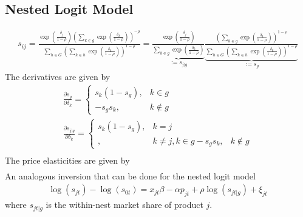\documentclass[11pt]{elegantbook}
\begin{document}
\subsection{Nested Logit Model}
\begin{equation}
    \begin{aligned}
        s_{ij}=\frac{\exp\left(\frac{\delta_{j}}{1-\rho}\right)\left(\sum_{k\in g}\exp\left(\frac{\delta_{k}}{1-\rho}\right)\right)^{-\rho}}{\sum_{h \in G}\left(\sum_{k\in h}\exp\left(\frac{\delta_{k}}{1-\rho}\right)\right)^{1-\rho}}=\underbrace{\frac{\exp\left(\frac{\delta_{j}}{1-\rho}\right)}{\sum_{k\in g}\exp\left(\frac{\delta_{k}}{1-\rho}\right)}}_{:=s_{j|g}}\underbrace{\frac{\left(\sum_{k\in g}\exp\left(\frac{\delta_{k}}{1-\rho}\right)\right)^{1-\rho}}{\sum_{h\in G}\left(\sum_{k\in h}\exp\left(\frac{\delta_{k}}{1-\rho}\right)\right)^{1-\rho}}}_{:=s_{g}}
    \end{aligned}
    \nonumber
\end{equation}
The derivatives are given by
\begin{equation}
    \begin{aligned}
        \frac{\partial s_{g}}{\partial \delta_k}=\left\{\begin{matrix}
            s_k(1-s_g),&k\in g\\
            -s_gs_k,&k\notin g
        \end{matrix}\right.\\
        \frac{\partial s_{j|g}}{\partial \delta_k}=\left\{\begin{matrix}
            s_k(1-s_g),&k=j\\
            ,&k\neq j,k\in g
            -s_gs_k,&k\notin g
        \end{matrix}\right.\\
    \end{aligned}
    \nonumber
\end{equation}
The price elasticities are given by
\begin{equation}
    \begin{aligned}
    \end{aligned}
    \nonumber
\end{equation}
An analogous inversion that can be done for the nested logit model
\begin{equation}
    \begin{aligned}
        \log(s_{jt})-\log(s_{0t})=x_{jt}\beta-\alpha p_{jt}+\rho\log\left(s_{jt|g}\right)+\xi_{jt}
    \end{aligned}
    \nonumber
\end{equation}
where $s_{jt|g}$ is the within-nest market share of product $j$.
\end{document}
